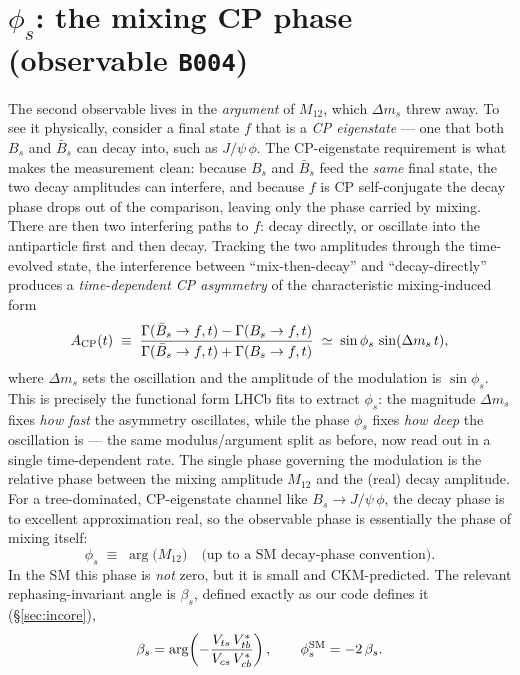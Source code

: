 \documentclass[11pt]{article}
\newcommand{\code}[1]{\texttt{#1}}
\newcommand{\Bs}{B_s}
\newcommand{\Bsbar}{\bar B_s}
\newcommand{\dms}{\Delta m_s}
\newcommand{\phis}{\phi_s}
\newcommand{\Mtwelve}{M_{12}}
\newcommand{\Vts}{V_{ts}}
\newcommand{\betas}{\beta_s}
\theoremstyle{definition}
\begin{document}
\section{$\phis$: the mixing CP phase (observable \code{B004})}
\label{sec:phis}

The second observable lives in the \emph{argument} of $\Mtwelve$, which $\dms$
threw away. To see it physically, consider a final state $f$ that is a \emph{CP
eigenstate} --- one that both $\Bs$ and $\Bsbar$ can decay into, such as
$J/\psi\,\phi$. The CP-eigenstate requirement is what makes the measurement
clean: because $\Bs$ and $\Bsbar$ feed the \emph{same} final state, the two decay
amplitudes can interfere, and because $f$ is CP self-conjugate the decay phase
drops out of the comparison, leaving only the phase carried by mixing. There are
then two interfering paths to $f$: decay directly, or oscillate into the
antiparticle first and then decay. Tracking the two amplitudes through the
time-evolved state, the interference between ``mix-then-decay'' and
``decay-directly'' produces a \emph{time-dependent CP asymmetry} of the
characteristic mixing-induced form
\begin{equation}
A_{\rm CP}(t) \;\equiv\;
\frac{\Gamma(\Bsbar\to f,t) - \Gamma(\Bs\to f,t)}{\Gamma(\Bsbar\to f,t)+\Gamma(\Bs\to f,t)}
\;\simeq\; \sin\phis\,\sin(\dms\, t),
\label{eq:acp}
\end{equation}
where $\dms$ sets the oscillation and the amplitude of the modulation is
$\sin\phis$. This is precisely the functional form LHCb fits to extract $\phis$:
the magnitude $\dms$ fixes \emph{how fast} the asymmetry oscillates, while the
phase $\phis$ fixes \emph{how deep} the oscillation is --- the same
modulus/argument split as before, now read out in a single time-dependent rate.
The single phase governing the modulation is the relative phase between the
mixing amplitude $\Mtwelve$ and the (real) decay amplitude. For a tree-dominated,
CP-eigenstate channel like $\Bs\to J/\psi\,\phi$, the decay phase is to excellent
approximation real, so the observable phase is essentially the phase of mixing
itself:
\begin{equation}
\phis \;\equiv\; \arg\!\big(\Mtwelve\big)\quad\text{(up to a SM decay-phase convention)}.
\label{eq:phisdef}
\end{equation}
In the SM this phase is \emph{not} zero, but it is small and CKM-predicted. The
relevant rephasing-invariant angle is $\betas$, defined exactly as our code
defines it (\S\ref{sec:incore}),
\begin{equation}
\betas = \arg\!\left(-\frac{\Vts\,V_{tb}^*}{V_{cs}\,V_{cb}^*}\right),
\qquad
\phis^{\rm SM} = -2\,\betas .
\label{eq:phissm}
\end{equation}
\end{document}
